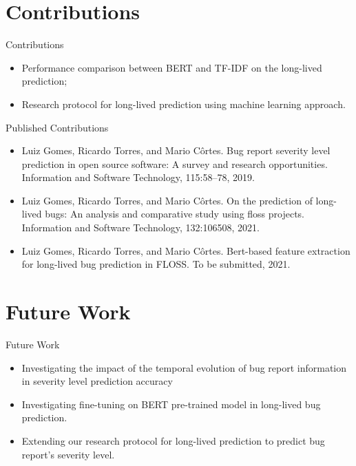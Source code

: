 \section{Contributions}
\begin{frame}[t,fragile]{Contributions}
\begin{itemize}
    \item Performance \alert{comparison} between BERT and TF-IDF on the long-lived prediction;
    \item Research \alert{protocol} for long-lived prediction using machine learning approach. 
\end{itemize}
\end{frame}

\begin{frame}{Published Contributions}
    \begin{itemize}
        \item Luiz Gomes, Ricardo Torres, and Mario Côrtes. Bug report severity level prediction
        in open source software: A survey and research opportunities. Information and
        Software Technology, 115:58–78, 2019.
        \item Luiz Gomes, Ricardo Torres, and Mario Côrtes. On the prediction of long-lived bugs:
        An analysis and comparative study using floss projects. Information and Software
        Technology, 132:106508, 2021.
        \item Luiz Gomes, Ricardo Torres, and Mario Côrtes. Bert-based feature extraction for
        long-lived bug prediction in FLOSS. To be submitted, 2021.
    \end{itemize}
    \end{frame}

\section{Future Work}
\begin{frame}[t,fragile]{Future Work}
\begin{itemize}
    \item Investigating the impact of \alert{the temporal evolution} of bug report information in severity level prediction accuracy
    \item Investigating \alert{fine-tuning} on BERT pre-trained model in long-lived bug prediction.
    \item \alert{Extending}	 our research protocol for long-lived prediction to predict bug report's severity level.\end{itemize}
\end{frame}

